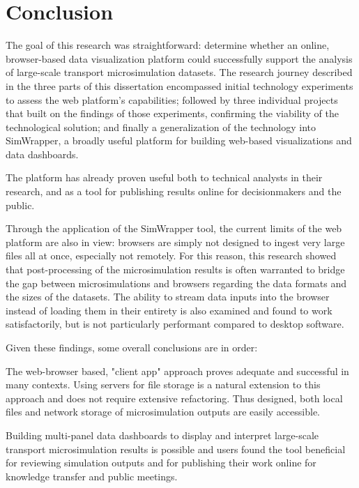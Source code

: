 

\section{Conclusion}
\label{08-conclusions-conclusion}

The goal of this research was straightforward: determine whether an online, browser-based data visualization platform could successfully support the analysis of large-scale transport microsimulation datasets. The research journey described in the three parts of this dissertation encompassed initial technology experiments to assess the web platform's capabilities; followed by three individual projects that built on the findings of those experiments, confirming the viability of the technological solution; and finally a generalization of the technology into SimWrapper, a broadly useful platform for building web-based visualizations and data dashboards.

The platform has already proven useful both to technical analysts in their research, and as a tool for publishing results online for decisionmakers and the public.

Through the application of the SimWrapper tool, the current limits of the web platform are also in view: browsers are simply not designed to ingest very large files all at once, especially not remotely. For this reason, this research showed that post-processing of the microsimulation results is often warranted to bridge the gap between microsimulations and browsers regarding the data formats and the sizes of the datasets. The ability to stream data inputs into the browser instead of loading them in their entirety is also examined and found to work satisfactorily, but is not particularly performant compared to desktop software.

Given these findings, some overall conclusions are in order:

The web-browser based, "client app" approach proves adequate and successful in many contexts. Using servers for file storage is a natural extension to this approach and does not require extensive refactoring. Thus designed, both local files and network storage of microsimulation outputs are easily accessible.

Building multi-panel data dashboards to display and interpret large-scale transport microsimulation results is possible and users found the tool beneficial for reviewing simulation outputs and for publishing their work online for knowledge transfer and public meetings.

